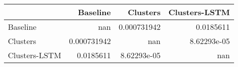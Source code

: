 \begin{tabular}{lrrr}
\toprule
               &      Baseline &      Clusters &   Clusters-LSTM \\
\midrule
 Baseline      & nan           &   0.000731942 &     0.0185611   \\
 Clusters      &   0.000731942 & nan           &     8.62293e-05 \\
 Clusters-LSTM &   0.0185611   &   8.62293e-05 &   nan           \\
\bottomrule
\end{tabular}